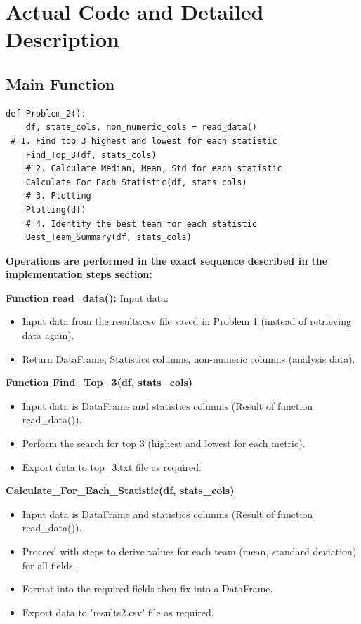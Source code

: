 \documentclass[12pt]{report}
\begin{document}
{{\section{Actual Code and Detailed Description} %
\subsection{Main Function} %
\begin{lstlisting}
def Problem_2():
    df, stats_cols, non_numeric_cols = read_data()
 # 1. Find top 3 highest and lowest for each statistic
    Find_Top_3(df, stats_cols)
    # 2. Calculate Median, Mean, Std for each statistic
    Calculate_For_Each_Statistic(df, stats_cols)
    # 3. Plotting
    Plotting(df)
    # 4. Identify the best team for each statistic
    Best_Team_Summary(df, stats_cols)
\end{lstlisting}
\textbf{Operations are performed in the exact sequence described in the implementation steps section:} %

\textbf* {Function read\_data():} Input data: %
\begin{itemize}
	\item Input data from the results.csv file saved in Problem 1 (instead of retrieving data again).
	\item Return DataFrame, Statistics columns, non-numeric columns (analysis data).
\end{itemize}

\textbf* {Function Find\_Top\_3(df, stats\_cols)} %
\begin{itemize}
	\item Input data is DataFrame and statistics columns (Result of function read\_data()).
	\item Perform the search for top 3 (highest and lowest for each metric).
	\item Export data to top\_3.txt file as required.
\end{itemize}

\textbf* {Calculate\_For\_Each\_Statistic(df, stats\_cols)} %
\begin{itemize}
	\item Input data is DataFrame and statistics columns (Result of function read\_data()).
	\item Proceed with steps to derive values for each team (mean, standard deviation) for all fields.
	\item Format into the required fields then fix into a DataFrame.
	\item Export data to 'results2.csv' file as required.
\end{itemize}

}}
\end{document}

